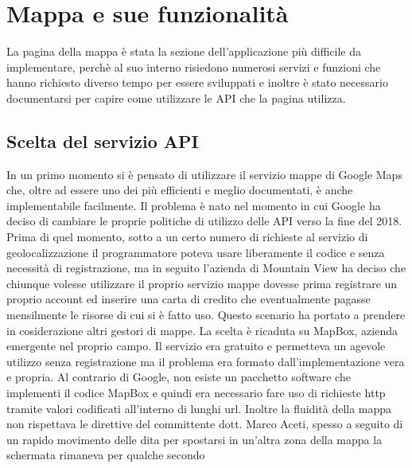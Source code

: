 \chapter{Mappa e sue funzionalità}
La pagina della mappa è stata la sezione dell'applicazione più difficile da
implementare, perchè al suo interno risiedono numerosi servizi e funzioni che
hanno richiesto diverso tempo per essere sviluppati e inoltre è stato necessario
documentarsi per capire come utilizzare le API che la pagina utilizza.

\section{Scelta del servizio API}
In un primo momento si è pensato di utilizzare il servizio mappe di Google Maps
che, oltre ad essere uno dei più efficienti e meglio documentati, è anche
implementabile facilmente. Il problema è nato nel momento in cui Google ha
deciso di cambiare le proprie politiche di utilizzo delle API verso la fine del
2018. Prima di quel momento, sotto a un certo numero di richieste al servizio di
geolocalizzazione il programmatore poteva usare liberamente il codice e senza
necessità di registrazione, ma in seguito l'azienda di Mountain View ha deciso
che chiunque volesse utilizzare il proprio servizio mappe dovesse prima
registrare un proprio account ed inserire una carta di credito che eventualmente
pagasse mensilmente le risorse di cui si è fatto uso. Questo scenario ha portato
a prendere in cosiderazione altri gestori di mappe. La scelta è ricaduta su
MapBox, azienda emergente nel proprio campo. Il servizio era gratuito e permetteva
un agevole utilizzo senza registrazione ma il problema era formato
dall'implementazione vera e propria. Al contrario di Google, non esiste un
pacchetto software che implementi il codice MapBox e quindi era necessario fare
uso di richieste http tramite valori codificati all'interno di lunghi url.
Inoltre la fluidità della mappa non rispettava le direttive del committente
dott. Marco Aceti, spesso a seguito di un rapido movimento delle dita per
spostarsi in un'altra zona della mappa la schermata rimaneva per qualche secondo

